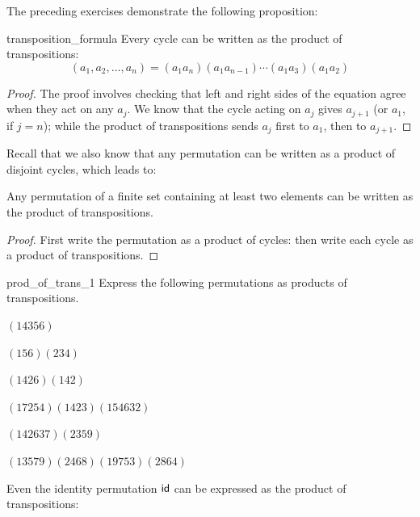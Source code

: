 \noindent
The preceding exercises demonstrate the following proposition:

\begin{prop}{transposition_formula}
Every cycle can be written as the product of transpositions:
\[ (a_1, a_2, \ldots, a_n ) = (a_1 a_n ) (a_1 a_{n-1} ) \cdots ( a_1 a_3 ) (a_1 a_2 ) \]
\end{prop}
\begin{proof}
The proof involves checking that left and right sides of the equation agree when they act on any $a_j$. We know that the cycle acting on $a_j$ gives $a_{j+1}$ (or $a_1$, if $j = n$); while the product of transpositions sends $a_j$ first to $a_1$, then to $a_{j+1}$.
\end{proof}

\noindent
Recall that we also know that any permutation can be written as a product of disjoint cycles, which leads to:

\begin{prop}{}
Any permutation of a finite set containing at least two elements can
be written as the product of transpositions. 
\end{prop}

\begin{proof} First write the permutation as a product of cycles: then write each cycle as a product of transpositions.
\end{proof}

\begin{exercise}{prod_of_trans_1}
Express the following permutations as products of transpositions. 

\begin{enumerate}[(a)]
\begin{multicols}{2}
 \item
$( 1 4 3 5 6 )$
\item
$( 1 5 6 )( 2 3 4 )$
 \item
$( 1 4 2 6 )( 1 4 2 )$
 \item
$( 1 7 2 5 4 )( 1 4 2 3 )( 1 5 4 6 3 2 )$
 \item
$( 1 4 2 6 3 7 )(2 3 5 9)$
\item
$( 1 3 5 7 9 )(2 4 6 8 ) (1 9 7 5 3) (2 8 6 4)$
\end{multicols}
\end{enumerate}

\end{exercise}

\noindent
Even the identity permutation ${\sf{i}d}$ can be expressed as the product of transpositions:

